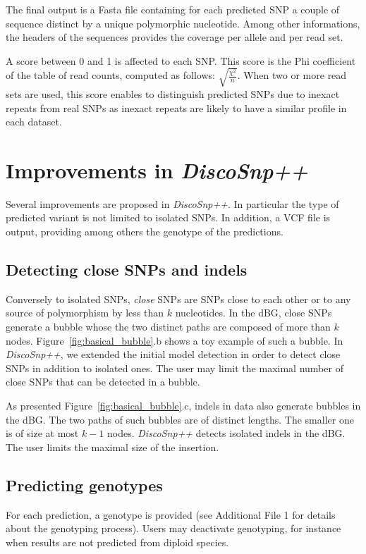 \documentclass{bmcart}
\newcommand{\discopp}{{\it DiscoSnp++}\xspace}
\begin{document}
The final output is a Fasta file containing for each predicted SNP a couple of sequence distinct by a unique polymorphic nucleotide. Among other informations, the headers of the sequences provides the coverage per allele and per read set. 

A score between 0 and 1 is affected to each SNP. This score is the Phi coefficient of the table of read counts, computed as follows: $\sqrt{\frac{\chi^2}{n}}$. When two or more read sets are used, this score enables to distinguish predicted SNPs due to inexact repeats from real SNPs as inexact repeats are likely to have a similar profile in each dataset.  



\section*{Improvements in \discopp}
Several improvements are proposed in \discopp. In particular the type of predicted variant is not limited to isolated SNPs. In addition, a VCF file is output, providing among others the genotype of the predictions.

\subsection*{Detecting close SNPs and indels}


Conversely to isolated SNPs, \emph{close} SNPs are SNPs close to each other or to any source of polymorphism by less than $k$ nucleotides.
In the dBG, close SNPs generate a bubble whose the two distinct paths are composed of more than $k$ nodes. Figure~\ref{fig:basical_bubble}.b shows a toy example of such a bubble.  
In \discopp, we extended the initial model detection in order to detect close SNPs in addition to isolated ones. The user may limit the maximal number of close SNPs that can be detected in a bubble. %

As presented Figure~\ref{fig:basical_bubble}.c, indels in data also generate bubbles in the dBG. The two paths of such bubbles are of distinct lengths. The smaller one is of size at most $k-1$ nodes. \discopp detects isolated indels in the dBG. The user limits the maximal size of the insertion. 

\subsection*{Predicting genotypes}
For each prediction, a genotype is provided (see Additional File 1 for details about the genotyping process). Users may deactivate genotyping, for instance when results are not predicted from diploid species.
\end{document}
